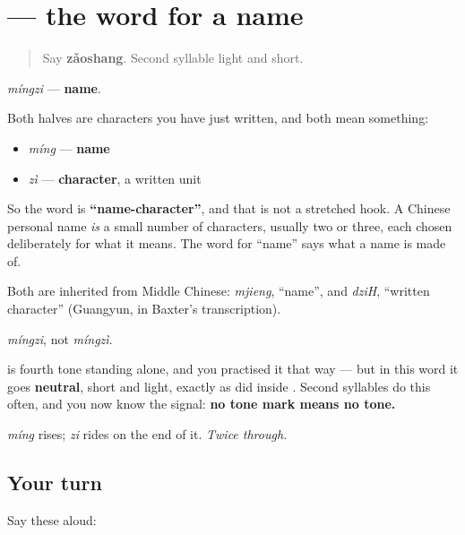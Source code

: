 \section[\texorpdfstring{\zh{名字} (míngzi)}{名字 (míngzi)}]{ — the word for a name}

\label{lesson:ZH-C08-mingzi}



\begin{quote}
Say \textbf{zǎoshang}. Second syllable light and short.
\end{quote}

\begin{cousinweb}
\textbf{} \emph{míngzi} — \textbf{name}.

Both halves are characters you have just written, and both mean something:

\begin{itemize}
\raggedright
  \item \textbf{} \emph{míng} — \textbf{name}
  \item \textbf{} \emph{zì} — \textbf{character}, a written unit
\end{itemize}

So the word is \textbf{\textquotedblleft{}name-character\textquotedblright{}}, and that is not a stretched hook. A Chinese personal name \emph{is} a small number of characters, usually two or three, each chosen deliberately for what it means. The word for \textquotedblleft{}name\textquotedblright{} says what a name is made of.

Both are inherited from Middle Chinese: \emph{mjieng}, \textquotedblleft{}name\textquotedblright{}, and \emph{dziH}, \textquotedblleft{}written character\textquotedblright{} (Guangyun, in Baxter's transcription).
\end{cousinweb}

\begin{sounds}
\emph{míngzi}, not \emph{míngzì}.

\textbf{} is fourth tone standing alone, and you practised it that way — but in this word it goes \textbf{neutral}, short and light, exactly as  did inside . Second syllables do this often, and you now know the signal: \textbf{no tone mark means no tone.}

\emph{míng} rises; \emph{zi} rides on the end of it. \emph{Twice through.}
\end{sounds}

\subsection*{Your turn}
Say these aloud:

